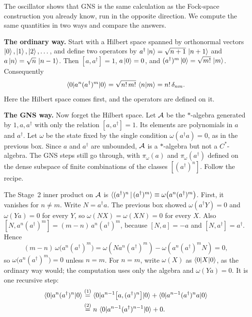 \begin{physconnect}
The oscillator shows that GNS is the same calculation as the Fock-space construction you already know, run
in the opposite direction. We compute the same quantities in two ways and compare the answers.

\textbf{The ordinary way.} Start with a Hilbert space spanned by orthonormal vectors
$\ket0,\ket1,\ket2,\dots$, and define two operators by $a^\dagger\ket n=\sqrt{n+1}\,\ket{n+1}$ and
$a\ket n=\sqrt n\,\ket{n-1}$. Then $[a,a^\dagger]=1$, $a\ket0=0$, and $(a^\dagger)^m\ket0=\sqrt{m!}\,\ket m$.
Consequently
\[
\braket{0|a^n(a^\dagger)^m|0}=\sqrt{n!\,m!}\,\braket{n|m}=n!\,\delta_{nm} .
\]
Here the Hilbert space comes first, and the operators are defined on it.

\textbf{The GNS way.} Now forget the Hilbert space. Let $\mathcal{A}$ be the $*$-algebra generated by $1,a,a^\dagger$
with only the relation $[a,a^\dagger]=1$. Its elements are polynomials in $a$ and $a^\dagger$. Let $\omega$
be the state fixed by the single condition $\omega(a^\dagger a)=0$, as in the previous box. Since $a$ and
$a^\dagger$ are unbounded, $\mathcal{A}$ is a $*$-algebra but not a $C^*$-algebra. The GNS steps still go through,
with $\pi_\omega(a)$ and $\pi_\omega(a^\dagger)$ defined on the dense subspace of finite combinations of the
classes $[(a^\dagger)^n]$. Follow the recipe.

The Stage~2 inner product on $\mathcal{A}$ is $\braket{(a^\dagger)^n\,|\,(a^\dagger)^m}\equiv
\omega\big(a^n(a^\dagger)^m\big)$. First, it vanishes for $n\ne m$. Write $N=a^\dagger a$. The previous box
showed $\omega(a^\dagger Y)=0$ and $\omega(Ya)=0$ for every $Y$, so $\omega(NX)=\omega(XN)=0$ for every $X$.
Also $[N,a^n(a^\dagger)^m]=(m-n)\,a^n(a^\dagger)^m$, because $[N,a]=-a$ and $[N,a^\dagger]=a^\dagger$. Hence
\[
(m-n)\,\omega\big(a^n(a^\dagger)^m\big)=\omega(Na^n(a^\dagger)^m)-\omega(a^n(a^\dagger)^mN)=0 ,
\]
so $\omega\big(a^n(a^\dagger)^m\big)=0$ unless $n=m$. For $n=m$, write $\omega(X)$ as $\braket{0|X|0}$, as the
ordinary way would; the computation uses only the algebra and $\omega(Ya)=0$. It is one recursive step:
\begin{align}
\braket{0|a^n(a^\dagger)^n|0}
&\overset{(1)}{=} \braket{0|a^{n-1}\big[a,(a^\dagger)^n\big]|0} + \braket{0|a^{n-1}(a^\dagger)^na|0} \notag\\
&\overset{(2)}{=} n\,\braket{0|a^{n-1}(a^\dagger)^{n-1}|0} + 0 . \notag
\end{align}
\quad
{}


\end{physconnect}
